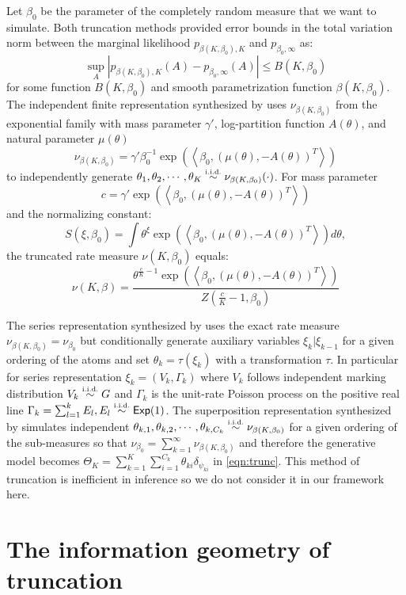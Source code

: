 \documentclass[letterpaper]{article}
\begin{document}
Let $\beta_0$ be the parameter of the completely random measure that we want to simulate. Both truncation methods provided error bounds in the total variation norm between the marginal likelihood $p_{\beta(K,\beta_0),K}$ and $p_{\beta_0,\infty}$ as:
\[
	\sup_A\left|p_{\beta(K,\beta_0),K}(A)-p_{\beta_0,\infty}(A)\right|\le B(K,\beta_0)
\]
for some function $B(K,\beta_0)$ and smooth parametrization function $\beta(K,\beta_0)$. The independent finite representation synthesized by \cite{nguyen20} uses $\nu_{\beta(K,\beta_0)}$ from the exponential family \cite{broderick18} with mass parameter $\gamma'$, log-partition function $A(\theta)$, and natural parameter $\mu(\theta)$ 
\[
	\nu_{\beta(K,\beta_0)}=\gamma'\beta_0^{-1}\exp\left(\left<\beta_0,\left(\mu(\theta),-A(\theta)\right)^T\right>\right)
\]
to independently generate $\theta_1,\theta_2,\cdots,\theta_K\distiid\nu_{\beta(K,\beta_0)}(\cdot)$.  For mass parameter 
\[
	c=\gamma'\exp\left(\left<\beta_0,\left(\mu(\theta),-A(\theta)\right)^T\right>\right)
\] and the normalizing constant:
\[
	S(\xi,\beta_0)=\int\theta^\xi\exp\left(\left<\beta_0,\left(\mu(\theta),-A(\theta)\right)^T\right>\right)d\theta,
\] 
the truncated rate measure $\nu(K,\beta_0)$ equals:
\[
	\nu(K,\beta)=\frac{\theta^{\frac{c}{K}-1}\exp\left(\left<\beta_0,\left(\mu(\theta),-A(\theta)\right)^T\right>\right)}{Z\left(\frac{c}{K}-1,\beta_0\right)}
\] 

The series representation synthesized by \cite{campbell19} uses the exact rate measure $\nu_{\beta(K,\beta_0)}=\nu_{\beta_0}$ but conditionally generate auxiliary variables $\xi_k|\xi_{k-1}$ for a given ordering of the atoms and set $\theta_k=\tau(\xi_k)$ with a transformation $\tau$. In particular for series representation $\xi_k=(V_k,\Gamma_k)$ where $V_k$ follows independent marking distribution $V_k\distiid G$ and $\Gamma_k$ is the unit-rate Poisson process on the positive real line $\Gamma_k=\sum_{l=1}^kE_l,E_l\distiid\distExp(1)$. The superposition representation synthesized by \cite{campbell19} simulates independent $\theta_{k,1},\theta_{k,2},\cdots,\theta_{k,C_k}\distiid\nu_{\beta(K,\beta_0)}$ for a given ordering of the sub-measures so  that $\nu_{\beta_0}=\sum_{k=1}^\infty\nu_{\beta(K,\beta_0)}$ and therefore the generative model becomes $\Theta_K=\sum_{k=1}^K\sum_{i=1}^{C_k}\theta_{ki}\delta_{\psi_{ki}}$ in \ref{eqn:trunc}. This method of truncation is inefficient in inference \cite{zhu20,nguyen20} so we do not consider it in our framework here. 

\section{The information geometry of truncation}
\end{document}
